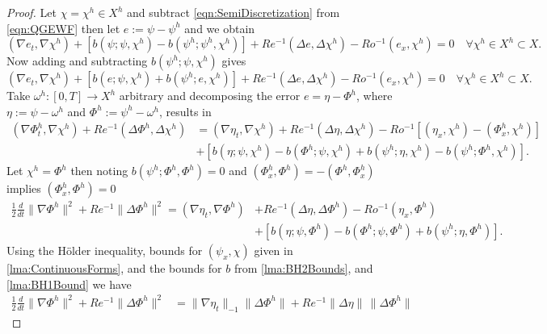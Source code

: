 \begin{proof}
  Let $\chi = \chi^h \in X^h$ and subtract \eqref{eqn:SemiDiscretization} from
  \eqref{eqn:QGEWF} then let $e:=\psi - \psi^h$ and we obtain
  \begin{equation*}
    (\nabla e_t, \nabla \chi^h) + \left[b(\psi;\psi,\chi^h) - b(\psi^h;\psi^h,\chi^h)\right]
      + Re^{-1}(\Delta e, \Delta \chi^h) - Ro^{-1} (e_x, \chi^h) = 0\quad
      \forall \chi^h \in X^h \subset X.
  \end{equation*}
  Now adding and subtracting $b(\psi^h;\psi,\chi^h)$ gives
  \begin{equation*}
    (\nabla e_t, \nabla \chi^h) + \left[b(e;\psi,\chi^h) + b(\psi^h;e,\chi^h)\right]
      + Re^{-1}(\Delta e, \Delta \chi^h) - Ro^{-1} (e_x, \chi^h) = 0\quad
      \forall \chi^h \in X^h \subset X.
  \end{equation*}
  Take $\omega^h:[0,T] \to X^h$ arbitrary and decomposing the error $e = \eta -
  \Phi^h$, where $\eta := \psi - \omega^h$ and $\Phi^h := \psi^h - \omega^h$,
  results in
  \begin{align*}
    (\nabla \Phi^h_t, \nabla \chi^h) + Re^{-1}(\Delta \Phi^h, \Delta \chi^h)
      & = (\nabla \eta_t, \nabla \chi^h) + Re^{-1}(\Delta \eta, \Delta \chi^h)
      - Ro^{-1} \left[(\eta_x, \chi^h) - (\Phi^h_x, \chi^h)\right] \\
    & + \left[ b(\eta;\psi,\chi^h) - b(\Phi^h;\psi,\chi^h)
      + b(\psi^h;\eta,\chi^h) - b(\psi^h;\Phi^h,\chi^h)\right].
  \end{align*}
  Let $\chi^h = \Phi^h$ then noting $b(\psi^h;\Phi^h,\Phi^h) = 0$ and $(\Phi^h_x,
  \Phi^h) = -(\Phi^h,\Phi^h_x)$ implies $(\Phi^h_x,\Phi^h) = 0$
  \begin{align*}
    \frac{1}{2} \frac{d}{dt} \|\nabla \Phi^h\|^2 + Re^{-1}\|\Delta \Phi^h\|^2
       = (\nabla \eta_t, \nabla \Phi^h) &+ Re^{-1}(\Delta \eta, \Delta \Phi^h)
      - Ro^{-1} (\eta_x, \Phi^h) \\
    & + \left[ b(\eta;\psi,\Phi^h) - b(\Phi^h;\psi,\Phi^h)
      + b(\psi^h;\eta,\Phi^h)\right].
  \end{align*}
  Using the H\"older inequality, bounds for $(\psi_x,\chi)$ given in
  \autoref{lma:ContinuousForms}, and the bounds for $b$ from
  \autoref{lma:BH2Bounds}, and \autoref{lma:BH1Bound} we have
  \begin{equation}
    \begin{split}
      \frac{1}{2} \frac{d}{dt} \|\nabla \Phi^h\|^2 + Re^{-1}\|\Delta \Phi^h\|^2
        &= \|\nabla \eta_t\|_{-1} \|\Delta \Phi^h\|
        + Re^{-1}\|\Delta \eta\|\, \|\Delta \Phi^h\|

\end{split}
\end{equation}
\end{proof}
